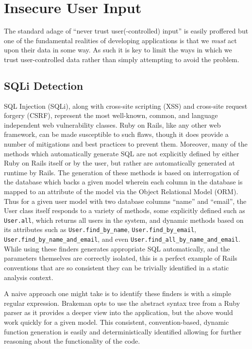 \documentclass[conference]{IEEEtran}
\begin{document}
\section{Insecure User Input}

The standard adage of ``never trust user(-controlled) input'' is easily
proffered but one of the fundamental realities of developing applications
is that we \emph{must} act upon their data in some way.  As such it is key to
limit the ways in which we trust user-controlled data rather than simply
attempting to avoid the problem.

\subsection{SQLi Detection}

SQL Injection (SQLi), along with cross-site scripting (XSS) and cross-site request forgery
(CSRF), represent the most well-known, common, and language independent web vulnerability
classes.  Ruby on Rails, like any other web framework, can be made susceptible to such
flaws, though it does provide a number of mitigations and best practices to prevent them.
Moreover, many of the methods which automatically generate SQL are not explicitly defined
by either Ruby on Rails itself or by the user, but rather are automatically generated at
runtime by Rails.  The generation of these methods is based on interrogation of the
database which backs a given model wherein each column in the database is mapped to an
attribute of the model via the Object Relational Model (ORM).  Thus for a given user model
with two database columns ``name'' and ``email'', the User class itself responds to a
variety of methods, some explicitly defined such as \texttt{User.all}, which returns all
users in the system, and dynamic methods based on its attributes such as
\texttt{User.find\_by\_name}, \texttt{User.find\_by\_email},
\texttt{User.find\_by\_name\_and\_email}, and even
\texttt{User.find\_all\_by\_name\_and\_email}.  While using these finders generates
appropriate SQL automatically, and the parameters themselves are correctly isolated, this
is a perfect example of Rails conventions that are so consistent they can be trivially
identified in a static analysis context.

A naive approach one might take is to identify these finders is with a simple regular
expression.  Brakeman opts to use the abstract syntax tree from a Ruby parser as it
provides a deeper view into the application, but the above would work quickly for a given
model.  This consistent, convention-based, dynamic function generation is easily and
deterministically identified allowing for further reasoning about the functionality of the
code.
\end{document}
